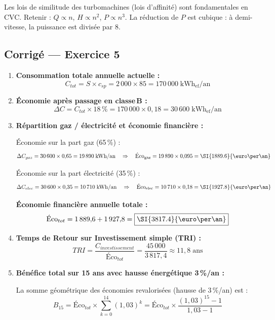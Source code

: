 \begin{methode}
Les lois de similitude des turbomachines (lois d'affinité) sont fondamentales en CVC. Retenir : $Q \propto n$, $H \propto n^2$, $P \propto n^3$. La réduction de $P$ est cubique : à demi-vitesse, la puissance est divisée par 8.
\end{methode}

\subsection*{Corrigé — Exercice 5}

\begin{enumerate}
  \item \textbf{Consommation totale annuelle actuelle :}
  \[
    C_{tot} = S \times c_{sp} = 2\,000 \times 85 = \boxed{170\,000\;\text{kWh}_\text{ef}/\text{an}}
  \]

  \item \textbf{Économie après passage en classe\,B :}
  \[
    \Delta C = C_{tot} \times 18\,\% = 170\,000 \times 0{,}18 = \boxed{30\,600\;\text{kWh}_\text{ef}/\text{an}}
  \]

  \item \textbf{Répartition gaz / électricité et économie financière :}

  Économie sur la part gaz (65\,\%) :
  \[
    \Delta C_{gaz} = 30\,600 \times 0{,}65 = 19\,890\;\text{kWh/an}
    \quad\Rightarrow\quad
    \text{Éco}_{\text{gaz}} = 19\,890 \times 0{,}095 = \SI{1889.6}{\euro\per\an}
  \]

  Économie sur la part électricité (35\,\%) :
  \[
    \Delta C_{elec} = 30\,600 \times 0{,}35 = 10\,710\;\text{kWh/an}
    \quad\Rightarrow\quad
    \text{Éco}_{\text{elec}} = 10\,710 \times 0{,}18 = \SI{1927.8}{\euro\per\an}
  \]

  \textbf{Économie financière annuelle totale :}
  \[
    \text{Éco}_{tot} = 1\,889{,}6 + 1\,927{,}8 = \boxed{\SI{3817.4}{\euro\per\an}}
  \]

  \item \textbf{Temps de Retour sur Investissement simple (TRI) :}
  \[
    TRI = \frac{C_{investissement}}{\text{Éco}_{tot}} = \frac{45\,000}{3\,817{,}4} \approx \boxed{11{,}8\;\text{ans}}
  \]

  \item \textbf{Bénéfice total sur 15 ans avec hausse énergétique 3\,\%/an :}

  La somme géométrique des économies revalorisées (hausse de 3\,\%/an) est :
  \[
    B_{15} = \text{Éco}_{tot} \times \sum_{k=0}^{14}(1{,}03)^k
           = \text{Éco}_{tot} \times \frac{(1{,}03)^{15} - 1}{1{,}03 - 1}
  \]


\end{enumerate}
